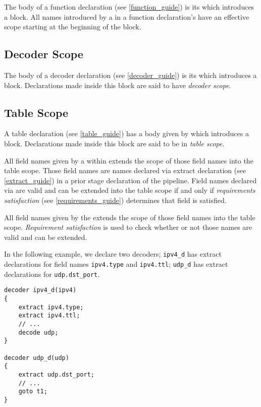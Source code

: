 The body of a function declaration (see \ref{function_guide}) is its  which introduces a block. All names introduced by a  in a function declaration's  have an effective scope starting at the beginning of the block.

\subsection{Decoder Scope} \label{decoder_scope}

The body of a decoder declaration (see \ref{decoder_guide}) is its  which introduces a block. Declarations made inside this block are said to have \textit{decoder scope}.

\subsection{Table Scope} \label{table_scope}

A table declaration (see \ref{table_guide}) has a body given by  which introduces a block. Declarations made inside this block are said to be in \textit{table scope}.

All field names given by a  within  extends the scope of those field names into the table scope. Those field names are names declared via extract declaration (see \ref{extract_guide}) in a prior stage declaration of the pipeline. Field names declared via  are valid and can be extended into the table scope if and only if \textit{requirements satisfaction} (see \ref{requirements_guide}) determines that field is satisfied. 

All field names given by the  extends the scope of those field names into the table scope. \textit{Requirement satisfaction} is used to check whether or not those names are valid and can be extended.

In the following example, we declare two decoders; \texttt{ipv4\_d} has extract declarations for field names \texttt{ipv4.type} and \texttt{ipv4.ttl}; \texttt{udp\_d} has extract declarations for \texttt{udp.dst\_port}.

\noindent\begin{minipage}{\linewidth}
\begin{lstlisting}
decoder ipv4_d(ipv4)
{
	extract ipv4.type;
	extract ipv4.ttl;
	// ...
	decode udp;
}

decoder udp_d(udp)
{
	extract udp.dst_port;
	// ...
	goto t1;
}
\end{lstlisting}
\end{minipage}

